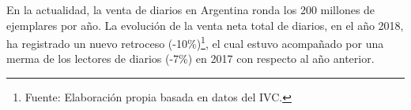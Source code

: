 {En la actualidad, la venta de diarios en Argentina ronda los 200 millones de ejemplares por año. La evolución de la venta neta total de diarios, en el año 2018, ha registrado un nuevo retroceso (-10\%)\footnote{Fuente: Elaboración propia basada en datos del IVC.}, el cual estuvo acompañado por una merma de los lectores de diarios (-7\%) en 2017 con respecto al año anterior.

%
}

